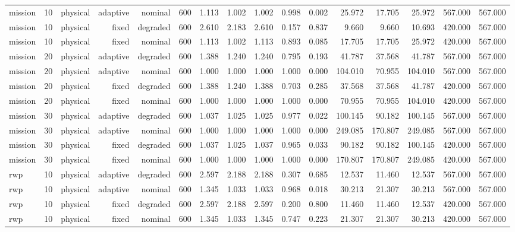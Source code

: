 \begin{tabular}{lrrrrrrrrrrrrrrr}
mission & 10 & physical & adaptive & nominal & 600 & 1.113 & 1.002 & 1.002 & 0.998 & 0.002 & 25.972 & 17.705 & 25.972 & 567.000 & 567.000 \\
mission & 10 & physical & fixed & degraded & 600 & 2.610 & 2.183 & 2.610 & 0.157 & 0.837 & 9.660 & 9.660 & 10.693 & 420.000 & 567.000 \\
mission & 10 & physical & fixed & nominal & 600 & 1.113 & 1.002 & 1.113 & 0.893 & 0.085 & 17.705 & 17.705 & 25.972 & 420.000 & 567.000 \\
mission & 20 & physical & adaptive & degraded & 600 & 1.388 & 1.240 & 1.240 & 0.795 & 0.193 & 41.787 & 37.568 & 41.787 & 567.000 & 567.000 \\
mission & 20 & physical & adaptive & nominal & 600 & 1.000 & 1.000 & 1.000 & 1.000 & 0.000 & 104.010 & 70.955 & 104.010 & 567.000 & 567.000 \\
mission & 20 & physical & fixed & degraded & 600 & 1.388 & 1.240 & 1.388 & 0.703 & 0.285 & 37.568 & 37.568 & 41.787 & 420.000 & 567.000 \\
mission & 20 & physical & fixed & nominal & 600 & 1.000 & 1.000 & 1.000 & 1.000 & 0.000 & 70.955 & 70.955 & 104.010 & 420.000 & 567.000 \\
mission & 30 & physical & adaptive & degraded & 600 & 1.037 & 1.025 & 1.025 & 0.977 & 0.022 & 100.145 & 90.182 & 100.145 & 567.000 & 567.000 \\
mission & 30 & physical & adaptive & nominal & 600 & 1.000 & 1.000 & 1.000 & 1.000 & 0.000 & 249.085 & 170.807 & 249.085 & 567.000 & 567.000 \\
mission & 30 & physical & fixed & degraded & 600 & 1.037 & 1.025 & 1.037 & 0.965 & 0.033 & 90.182 & 90.182 & 100.145 & 420.000 & 567.000 \\
mission & 30 & physical & fixed & nominal & 600 & 1.000 & 1.000 & 1.000 & 1.000 & 0.000 & 170.807 & 170.807 & 249.085 & 420.000 & 567.000 \\
rwp & 10 & physical & adaptive & degraded & 600 & 2.597 & 2.188 & 2.188 & 0.307 & 0.685 & 12.537 & 11.460 & 12.537 & 567.000 & 567.000 \\
rwp & 10 & physical & adaptive & nominal & 600 & 1.345 & 1.033 & 1.033 & 0.968 & 0.018 & 30.213 & 21.307 & 30.213 & 567.000 & 567.000 \\
rwp & 10 & physical & fixed & degraded & 600 & 2.597 & 2.188 & 2.597 & 0.200 & 0.800 & 11.460 & 11.460 & 12.537 & 420.000 & 567.000 \\
rwp & 10 & physical & fixed & nominal & 600 & 1.345 & 1.033 & 1.345 & 0.747 & 0.223 & 21.307 & 21.307 & 30.213 & 420.000 & 567.000 \\

\end{tabular}
